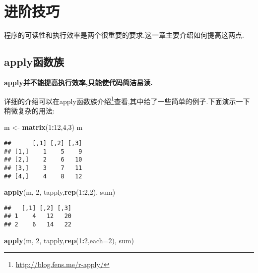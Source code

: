 \documentclass[]{ctexbook}
\newenvironment{Shaded}{\begin{snugshade}}{\end{snugshade}}
\newcommand{\DataTypeTok}[1]{\textcolor[rgb]{0.13,0.29,0.53}{#1}}
\newcommand{\DecValTok}[1]{\textcolor[rgb]{0.00,0.00,0.81}{#1}}
\newcommand{\KeywordTok}[1]{\textcolor[rgb]{0.13,0.29,0.53}{\textbf{#1}}}
\newcommand{\NormalTok}[1]{#1}
\newcommand{\OperatorTok}[1]{\textcolor[rgb]{0.81,0.36,0.00}{\textbf{#1}}}
\newcommand{\StringTok}[1]{\textcolor[rgb]{0.31,0.60,0.02}{#1}}
\renewcommand{\href}[2]{#2\footnote{\url{#1}}}
\begin{document}
\hypertarget{section-11}{%
\chapter{进阶技巧}\label{section-11}}

程序的可读性和执行效率是两个很重要的要求.这一章主要介绍如何提高这两点.

\hypertarget{apply}{%
\section{apply函数族}\label{apply}}

\textbf{apply并不能提高执行效率,只能使代码简洁易读.}

详细的介绍可以在\href{http://blog.fens.me/r-apply/}{apply函数族介绍}查看,其中给了一些简单的例子.下面演示一下稍微复杂的用法:

\begin{Shaded}
\begin{Highlighting}[]
\NormalTok{m <-}\StringTok{ }\KeywordTok{matrix}\NormalTok{(}\DecValTok{1}\OperatorTok{:}\DecValTok{12}\NormalTok{,}\DecValTok{4}\NormalTok{,}\DecValTok{3}\NormalTok{)}
\NormalTok{m}
\end{Highlighting}
\end{Shaded}

\begin{verbatim}
##      [,1] [,2] [,3]
## [1,]    1    5    9
## [2,]    2    6   10
## [3,]    3    7   11
## [4,]    4    8   12
\end{verbatim}

\begin{Shaded}
\begin{Highlighting}[]
\KeywordTok{apply}\NormalTok{(m, }\DecValTok{2}\NormalTok{, tapply,}\KeywordTok{rep}\NormalTok{(}\DecValTok{1}\OperatorTok{:}\DecValTok{2}\NormalTok{,}\DecValTok{2}\NormalTok{), sum)}
\end{Highlighting}
\end{Shaded}

\begin{verbatim}
##   [,1] [,2] [,3]
## 1    4   12   20
## 2    6   14   22
\end{verbatim}

\begin{Shaded}
\begin{Highlighting}[]
\KeywordTok{apply}\NormalTok{(m, }\DecValTok{2}\NormalTok{, tapply,}\KeywordTok{rep}\NormalTok{(}\DecValTok{1}\OperatorTok{:}\DecValTok{2}\NormalTok{,}\DataTypeTok{each=}\DecValTok{2}\NormalTok{), sum)}
\end{Highlighting}
\end{Shaded}
\end{document}
